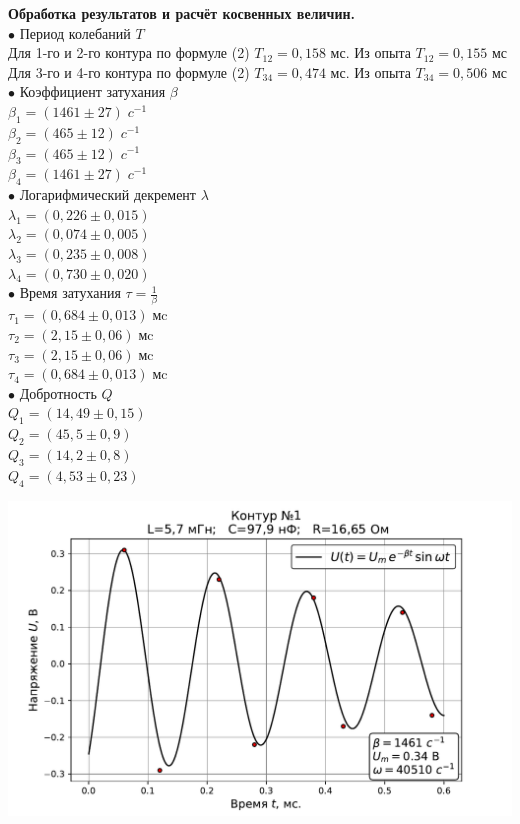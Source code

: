 \documentclass[ a4paper]{article}
\begin{document}
{\parindent=0pt\textbf{Обработка результатов и расчёт косвенных величин.}}\\
{\parindent=0pt
$\bullet$ Период колебаний $T$\\
Для 1-го и 2-го контура по формуле (2)  $T_{12}  = 0,158$ мс. Из опыта $T_{12}=0,155$ мс\\
Для 3-го и 4-го контура по формуле (2)  $T_{34}  = 0,474$ мс. Из опыта $T_{34}=0,506$ мс\\

$\bullet$ Коэффициент затухания $\beta$ \\
$\beta_1=(1461\pm27)\;c^{-1}$\\
$\beta_2=(465\pm12)\;c^{-1}$\\
$\beta_3=(465\pm12)\;c^{-1}$\\
$\beta_4=(1461\pm27)\;c^{-1}$\\

$\bullet$ Логарифмический декремент $\lambda$\\
$\lambda_1=(0,226\pm0,015)$\\
$\lambda_2=(0,074\pm0,005)$\\
$\lambda_3=(0,235\pm0,008)$\\
$\lambda_4=(0,730\pm0,020)$\\

$\bullet$ Время затухания $\tau=\frac{1}{\beta}$\\
$\tau_1=(0,684\pm0,013)\;\mbox{мc}$\\
$\tau_2=(2,15\pm0,06)\;\mbox{мc}$\\
$\tau_3=(2,15\pm0,06)\;\mbox{мc}$\\
$\tau_4=(0,684\pm0,013)\;\mbox{мc}$\\

$\bullet$ Добротность $Q$\\
$Q_1=(14,49\pm0,15)$\\
$Q_2=(45,5\pm0,9)$\\
$Q_3=(14,2\pm0,8)$\\
$Q_4=(4,53\pm0,23)$\\
}
\begin{center}
		\includegraphics[scale=0.65]{1.pdf}
\end{center}
\end{document}
